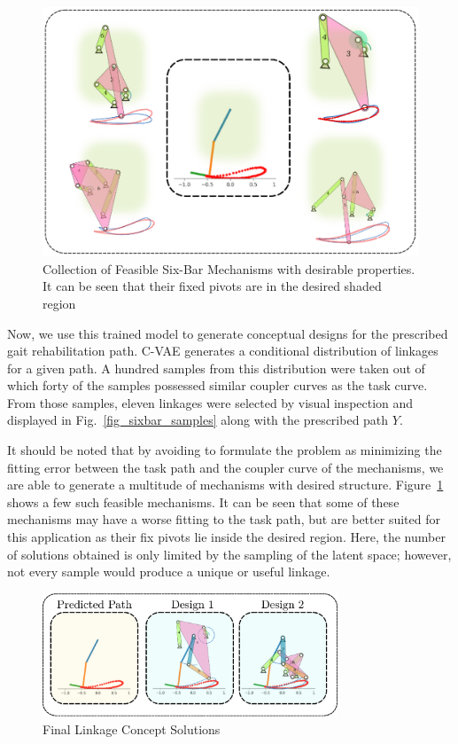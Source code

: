 \begin{figure}
\centering
\includegraphics[width=\textwidth]{jmd-19/figure/fig_sixbar_solutions_1.eps}
  \caption{Collection of Feasible Six-Bar Mechanisms with desirable properties. It can be seen that their fixed pivots are in the desired shaded region}
\label{fig_sixbar_solutions_1}
\end{figure}

Now, we use this trained model to generate conceptual designs for the prescribed gait rehabilitation path.
C-VAE generates a conditional distribution of linkages for a given path. A hundred samples from this distribution were taken out of which forty of the samples possessed similar coupler curves as the task curve. From those samples, eleven linkages were selected by visual inspection and displayed in Fig.~\ref{fig_sixbar_samples} along with the prescribed path $Y$.

It should be noted that by avoiding to formulate the problem as minimizing the fitting error between the task path and the coupler curve of the mechanisms, we are able to generate a multitude of mechanisms with desired structure.
Figure~\ref{fig_sixbar_solutions_1} shows a few such feasible mechanisms. It can be seen that some of these mechanisms may have a worse fitting to the task path, but are better suited for this application as their fix pivots lie inside the desired region. Here, the number of  solutions obtained is only limited by the sampling of the latent space; however, not every sample would produce a unique or useful linkage.

\begin{figure}
\centering
\includegraphics[width=250pt]{jmd-19/figure/fig_final_solutions.eps}
  \caption{Final Linkage Concept Solutions}
\label{fig_final_samples}
\end{figure}

